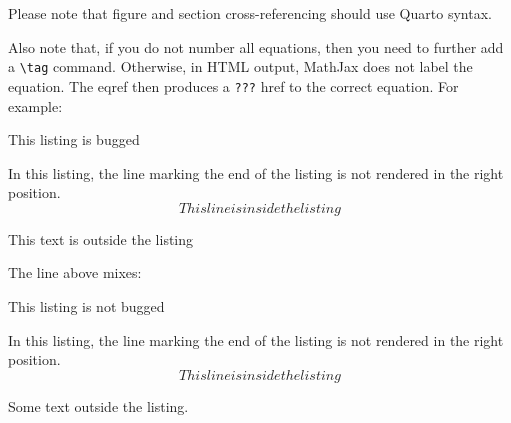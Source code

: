 \documentclass[
  letterpaper,
  DIV=11,
  numbers=noendperiod]{scrartcl}
\newcommand{\VERB}{\Verb[commandchars=\\\{\}]}
\newenvironment{Shaded}{\begin{snugshade}}{\end{snugshade}}
\newcommand{\AttributeTok}[1]{\textcolor[rgb]{0.40,0.45,0.13}{#1}}
\newcommand{\NormalTok}[1]{\textcolor[rgb]{0.00,0.23,0.31}{#1}}
\newcommand{\SpecialStringTok}[1]{\textcolor[rgb]{0.13,0.47,0.30}{#1}}
\providecommand{\tightlist}{%
  \setlength{\itemsep}{0pt}\setlength{\parskip}{0pt}}\usepackage{longtable,booktabs,array}
\theoremstyle{plain}
\theoremstyle{remark}
\begin{document}
Please note that figure and section cross-referencing should use Quarto
syntax.

Also note that, if you do not number all equations, then you need to
further add a \texttt{\textbackslash{}tag} command. Otherwise, in HTML
output, MathJax does not label the equation. The eqref then produces a
\texttt{???} href to the correct equation. For example:

\begin{codelisting}

\caption{This listing is bugged}

\hypertarget{lst-bugged-listing}{%
\label{lst-bugged-listing}}%
\begin{Shaded}
\begin{Highlighting}[]
\NormalTok{In this listing, the line marking}
\NormalTok{the end of the listing is not rendered}
\NormalTok{in the right position.}
\SpecialStringTok{$$ This line is inside the listing $$}
\end{Highlighting}
\end{Shaded}

\end{codelisting}

This text is outside the listing

The line above mixes:


\begin{codelisting}

\caption{This listing is not bugged}

\hypertarget{lst-bugged-listing2}{%
\label{lst-bugged-listing2}}%
\begin{Shaded}
\begin{Highlighting}[]
\NormalTok{In this listing, the line marking}
\NormalTok{the end of the listing is not rendered}
\NormalTok{in the right position.}
\SpecialStringTok{$$ This line is inside the listing $$}
\end{Highlighting}
\end{Shaded}

\end{codelisting}

Some text outside the listing.
\end{document}

